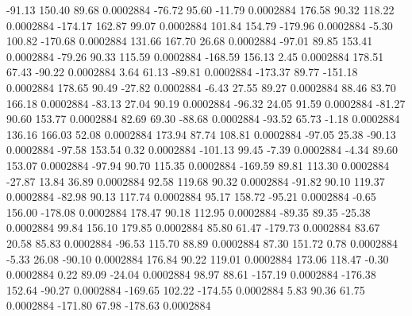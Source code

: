       -91.13      150.40       89.68     0.0002884
      -76.72       95.60      -11.79     0.0002884
      176.58       90.32      118.22     0.0002884
     -174.17      162.87       99.07     0.0002884
      101.84      154.79     -179.96     0.0002884
       -5.30      100.82     -170.68     0.0002884
      131.66      167.70       26.68     0.0002884
      -97.01       89.85      153.41     0.0002884
      -79.26       90.33      115.59     0.0002884
     -168.59      156.13        2.45     0.0002884
      178.51       67.43      -90.22     0.0002884
        3.64       61.13      -89.81     0.0002884
     -173.37       89.77     -151.18     0.0002884
      178.65       90.49      -27.82     0.0002884
       -6.43       27.55       89.27     0.0002884
       88.46       83.70      166.18     0.0002884
      -83.13       27.04       90.19     0.0002884
      -96.32       24.05       91.59     0.0002884
      -81.27       90.60      153.77     0.0002884
       82.69       69.30      -88.68     0.0002884
      -93.52       65.73       -1.18     0.0002884
      136.16      166.03       52.08     0.0002884
      173.94       87.74      108.81     0.0002884
      -97.05       25.38      -90.13     0.0002884
      -97.58      153.54        0.32     0.0002884
     -101.13       99.45       -7.39     0.0002884
       -4.34       89.60      153.07     0.0002884
      -97.94       90.70      115.35     0.0002884
     -169.59       89.81      113.30     0.0002884
      -27.87       13.84       36.89     0.0002884
       92.58      119.68       90.32     0.0002884
      -91.82       90.10      119.37     0.0002884
      -82.98       90.13      117.74     0.0002884
       95.17      158.72      -95.21     0.0002884
       -0.65      156.00     -178.08     0.0002884
      178.47       90.18      112.95     0.0002884
      -89.35       89.35      -25.38     0.0002884
       99.84      156.10      179.85     0.0002884
       85.80       61.47     -179.73     0.0002884
       83.67       20.58       85.83     0.0002884
      -96.53      115.70       88.89     0.0002884
       87.30      151.72        0.78     0.0002884
       -5.33       26.08      -90.10     0.0002884
      176.84       90.22      119.01     0.0002884
      173.06      118.47       -0.30     0.0002884
        0.22       89.09      -24.04     0.0002884
       98.97       88.61     -157.19     0.0002884
     -176.38      152.64      -90.27     0.0002884
     -169.65      102.22     -174.55     0.0002884
        5.83       90.36       61.75     0.0002884
     -171.80       67.98     -178.63     0.0002884
